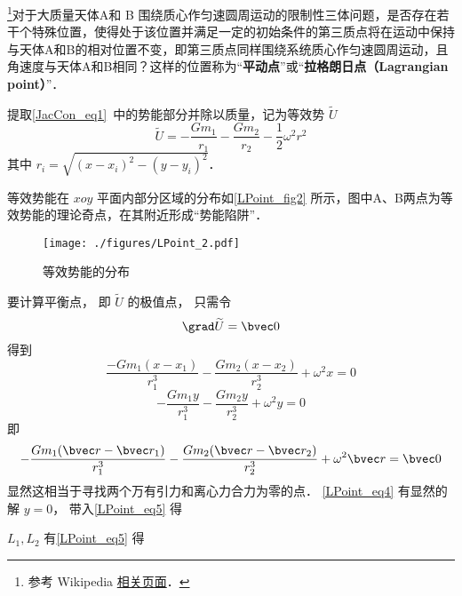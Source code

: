 

\footnote{参考 Wikipedia \href{https://en.wikipedia.org/wiki/Lagrange_point}{相关页面}．}对于大质量天体A和 B 围绕质心作匀速圆周运动的限制性三体问题，是否存在若干个特殊位置，使得处于该位置并满足一定的初始条件的第三质点将在运动中保持与天体A和B的相对位置不变，即第三质点同样围绕系统质心作匀速圆周运动，且角速度与天体A和B相同？这样的位置称为“\textbf{平动点}”或“\textbf{拉格朗日点（Lagrangian point）}”．

提取\autoref{JacCon_eq1}~中的势能部分并除以质量，记为等效势 $\widetilde{U}$ 
\begin{equation}
\widetilde{U} = -\frac{Gm_1}{r_1} -\frac{Gm_2}{r_2} -\frac{1}{2}\omega^2 r^2
\end{equation}
其中 $r_i = \sqrt{(x - x_i)^2 - (y - y_i)^2}$．

等效势能在 $xoy$ 平面内部分区域的分布如\autoref{LPoint_fig2} 所示，图中A、B两点为等效势能的理论奇点，在其附近形成“势能陷阱”． 
\begin{figure}[ht]
\centering
\texttt{[image: ./figures/LPoint\_2.pdf]}
\caption{等效势能的分布} \label{LPoint_fig2}
\end{figure}

要计算平衡点， 即 $\widetilde{U}$ 的极值点， 只需令
\begin{equation}
\grad \widetilde{U} = \bvec 0
\end{equation}
得到
\begin{equation}\label{LPoint_eq5}
\frac{-Gm_1(x-x_1)}{r_1^3} - \frac{Gm_2(x-x_2)}{r_2^3} + \omega^2 x = 0
\end{equation}
\begin{equation}\label{LPoint_eq4}
-\frac{Gm_1 y}{r_1^3} - \frac{Gm_2 y}{r_2^3} + \omega^2 y = 0
\end{equation}
即
\begin{equation}
-\frac{Gm_1(\bvec r - \bvec r_1)}{r_1^3} - \frac{Gm_2(\bvec r - \bvec r_2)}{r_2^3} + \omega^2 \bvec r = \bvec 0
\end{equation}
显然这相当于寻找两个万有引力和离心力合力为零的点． \autoref{LPoint_eq4} 有显然的解 $y = 0$， 带入\autoref{LPoint_eq5} 得

 $L_1, L_2$ 有\autoref{LPoint_eq5} 得





